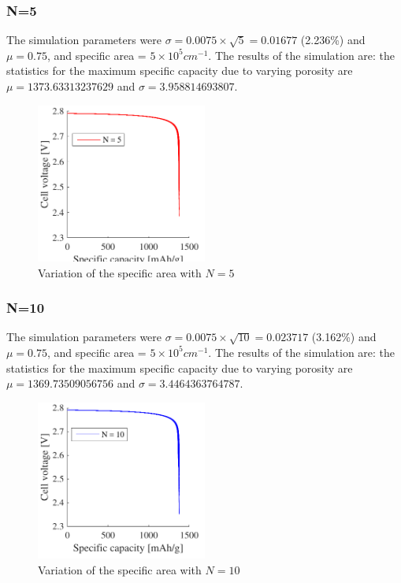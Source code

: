 \documentclass[12pt]{book}
\begin{document}
\subsubsection{N=5}

The simulation parameters were $\sigma=0.0075\times\sqrt{5}=0.01677$
(2.236\%) and $\mu=0.75$, and specific area = $5\times10^{5}cm^{-1}$.
The results of the simulation are: the statistics for the maximum
specific capacity due to varying porosity are $\mu=1373.63313237629$
and $\sigma=3.958814693807$.
\begin{figure}[htb]
	\centering
	\includegraphics[width=0.5\textwidth]{figures/Petru_N_5_012016}
	\caption{Variation of the specific area with $N = 5$}
\end{figure}

\subsubsection{N=10}

The simulation parameters were $\sigma=0.0075\times\sqrt{10}=0.023717$
(3.162\%) and $\mu=0.75$, and specific area = $5\times10^{5}cm^{-1}$.
The results of the simulation are: the statistics for the maximum
specific capacity due to varying porosity are $\mu=1369.73509056756$
and $\sigma=3.4464363764787$.
\begin{figure}[htb]
	\centering
	\includegraphics[width=0.5\textwidth]{figures/Petru_N_10_012016}
	\caption{Variation of the specific area with $N = 10$}
\end{figure}
\end{document}
